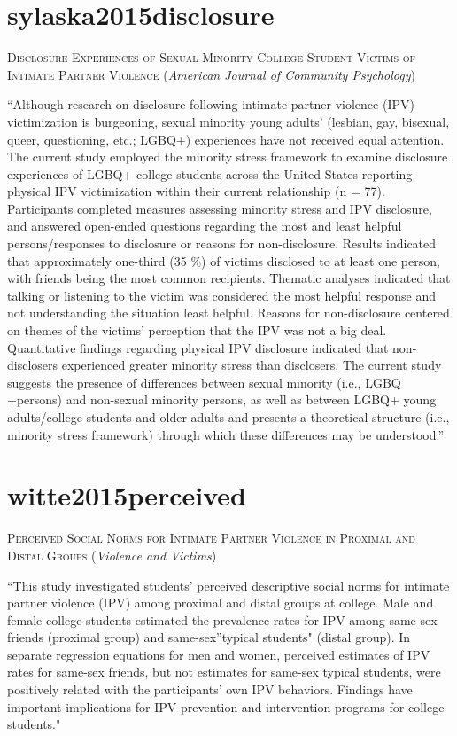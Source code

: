 \documentclass[]{tufte-handout}
\begin{document}
\section{\texorpdfstring{\textcolor[HTML]{5b0057}{sylaska2015disclosure}}{}}\label{section-59}

\textsc{\large{Disclosure Experiences of Sexual Minority College Student Victims of Intimate Partner Violence}}
(\emph{American Journal of Community Psychology})

``Although research on disclosure following intimate partner violence
(IPV) victimization is burgeoning, sexual minority young adults'
(lesbian, gay, bisexual, queer, questioning, etc.; LGBQ+) experiences
have not received equal attention. The current study employed the
minority stress framework to examine disclosure experiences of LGBQ+
college students across the United States reporting physical IPV
victimization within their current relationship (n = 77). Participants
completed measures assessing minority stress and IPV disclosure, and
answered open-ended questions regarding the most and least helpful
persons/responses to disclosure or reasons for non-disclosure. Results
indicated that approximately one-third (35 \%) of victims disclosed to
at least one person, with friends being the most common recipients.
Thematic analyses indicated that talking or listening to the victim was
considered the most helpful response and not understanding the situation
least helpful. Reasons for non-disclosure centered on themes of the
victims' perception that the IPV was not a big deal. Quantitative
findings regarding physical IPV disclosure indicated that non-disclosers
experienced greater minority stress than disclosers. The current study
suggests the presence of differences between sexual minority (i.e., LGBQ
+persons) and non-sexual minority persons, as well as between LGBQ+
young adults/college students and older adults and presents a
theoretical structure (i.e., minority stress framework) through which
these differences may be understood.''

\section{\texorpdfstring{\textcolor[HTML]{5b0057}{witte2015perceived}}{}}\label{section-60}

\textsc{\large{Perceived Social Norms for Intimate Partner Violence in Proximal and Distal Groups}}
(\emph{Violence and Victims})

``This study investigated students' perceived descriptive social norms
for intimate partner violence (IPV) among proximal and distal groups at
college. Male and female college students estimated the prevalence rates
for IPV among same-sex friends (proximal group) and same-sex''typical
students" (distal group). In separate regression equations for men and
women, perceived estimates of IPV rates for same-sex friends, but not
estimates for same-sex typical students, were positively related with
the participants' own IPV behaviors. Findings have important
implications for IPV prevention and intervention programs for college
students."
\end{document}
